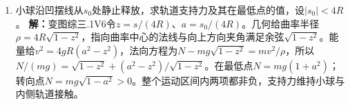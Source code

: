 \documentclass[UTF8,fontset=fandol,a4paper,11pt]{ctexart}
\begin{document}
\begin{enumerate}
\item 小球沿凹摆线从$s_0$处静止释放，求轨道支持力及其在最低点的值，设$|s_0|<4R$。
\textbf{解：}变图综三.1V6令$z=s/(4R)$、$a=s_0/(4R)$。几何给曲率半径$\rho=4R\sqrt{1-z^2}$，指向曲率中心的法线与向上方向夹角满足余弦$\sqrt{1-z^2}$。能量给$v^2=4gR(a^2-z^2)$，法向方程为$N-mg\sqrt{1-z^2}=mv^2/\rho$，所以$N/(mg)=\sqrt{1-z^2}+(a^2-z^2)/\sqrt{1-z^2}$。在最低点$N=mg(1+a^2)$；转向点$N=mg\sqrt{1-a^2}>0$。整个运动区间内两项都非负，支持力维持小球与内侧轨道接触。
\begin{center}\begin{minipage}{.98\linewidth}\centering
{}
\end{minipage}
\end{center}
\end{enumerate}
\end{document}
